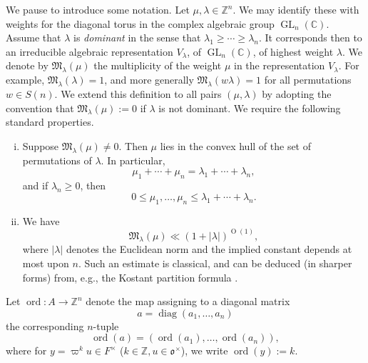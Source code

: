 \documentclass[reqno]{amsart}
\DeclareMathOperator{\GL}{GL}
\DeclareMathOperator{\diag}{diag}
\def\O{\operatorname{O}}
\DeclareMathOperator{\ord}{ord}
\theoremstyle{plain} \newtheorem{theorem} {Theorem}
\theoremstyle{definition} \newtheorem{definition} [theorem] {Definition}
\theoremstyle{itplain} %
\numberwithin{equation}{section}
\numberwithin{theorem}{section}
\renewcommand{\geq}{\geqslant}
\renewcommand{\leq}{\leqslant}
\begin{document}
We pause to introduce some notation.  Let $\mu, \lambda \in \mathbb{Z}^n$.  We may identify these with weights for the diagonal torus in the complex algebraic group $\GL_n(\mathbb{C})$.  Assume that $\lambda$ is \emph{dominant} in the sense that $\lambda_1 \geq \dotsb \geq \lambda_n$.  It corresponds then to an irreducible algebraic representation $V_\lambda$, of $\GL_n(\mathbb{C})$, of highest weight $\lambda$.  We denote by $\mathfrak{M}_{\lambda}(\mu)$ the multiplicity of the weight $\mu$ in the representation $V_\lambda$.  For example, $\mathfrak{M}_{\lambda}(\lambda) = 1$, and more generally $\mathfrak{M}_{\lambda}(w \lambda) = 1$ for all permutations $w \in S(n)$.  We extend this definition to all pairs $(\mu,\lambda)$ by adopting the convention that $\mathfrak{M}_{\lambda}(\mu) := 0$ if $\lambda$ is not dominant.  We require the following standard properties.
\begin{enumerate}[(i)]
\item Suppose $\mathfrak{M}_{\lambda}(\mu) \neq 0$.  Then $\mu$ lies in the convex hull of the set of permutations of $\lambda$.  In particular,
  \begin{equation}\label{eq:mu_1-+-dotsb}
    \mu_1 + \dotsb + \mu_n = \lambda_1 + \dotsb + \lambda_n,
  \end{equation}
  and if $\lambda_n \geq 0$, then
  \begin{equation}\label{eq:0-leq-mu_1}
    0 \leq \mu_1,\dotsc,\mu_n \leq \lambda_1 + \dotsb + \lambda_n.
  \end{equation}
\item We have
  \begin{equation}\label{eq:mathfr-ll-1}
\mathfrak{M}_{\lambda}(\mu) \ll (1 + |\lambda|)^{\O(1)},
\end{equation}
where $|\lambda|$ denotes the Euclidean norm and the implied constant depends at most upon $n$.  Such an estimate is classical, and can be deduced (in sharper forms) from, e.g., the Kostant partition formula \cite[p258, Theorem IV.3.2]{MR1410059}.
\end{enumerate}


Let $\ord : A \rightarrow \mathbb{Z}^n$ denote the map assigning to a diagonal matrix
\begin{equation*}
a = \diag(a_1,\dotsc,a_n)
\end{equation*}
the corresponding $n$-tuple
\begin{equation*}
\ord(a) = (\ord(a_1),\dotsc,\ord(a_n)),
\end{equation*}
where for $y = \varpi^k u \in F^\times$ ($k \in \mathbb{Z}, u \in \mathfrak{o}^\times$), we write $\ord(y) := k$.
\end{document}
